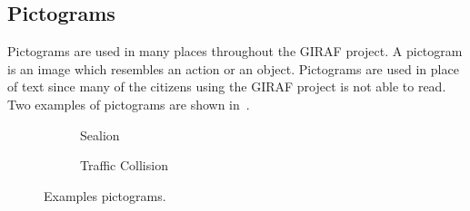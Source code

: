 \subsection{Pictograms}
Pictograms are used in many places throughout the GIRAF project.
A pictogram is an image which resembles an action or an object.
Pictograms are used in place of text since many of the citizens using the GIRAF project is not able to read.
Two examples of pictograms are shown in~.

\begin{figure}[H]
    \centering
    \begin{subfigure}[b]{0.2\textwidth}
        \caption{Sealion}
        \label{fig:sealion}
    \end{subfigure}
    \qquad
    \begin{subfigure}[b]{0.2\textwidth}
        \caption{Traffic Collision}
        \label{fig:traffic_collision}
    \end{subfigure}
    \caption{Examples pictograms.}\label{fig:pictograms}
\end{figure}

